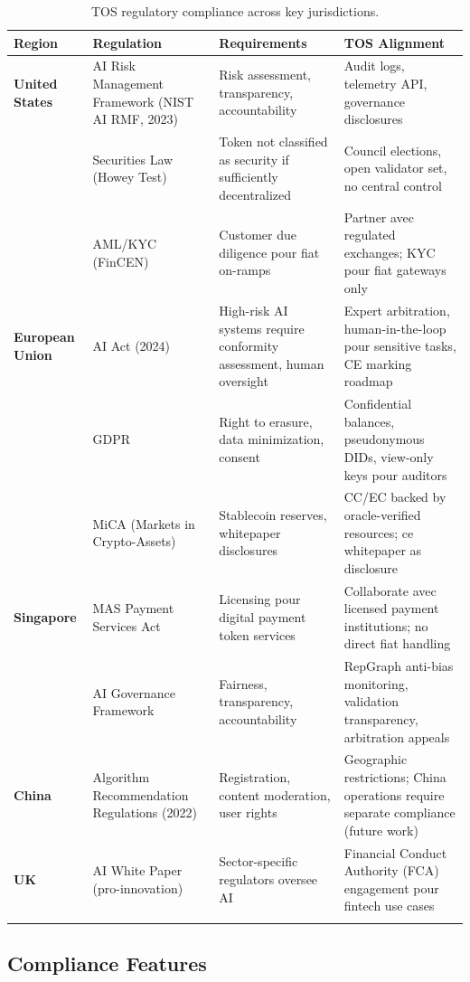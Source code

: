 \documentclass[11pt]{article}
\begin{document}
\begin{longtable}{@{}p{}p{}p{}p{}@{}}
\toprule
\textbf{Region} & \textbf{Regulation} & \textbf{Requirements} & \textbf{TOS Alignment} \\\midrule
\textbf{United States} & AI Risk Management Framework (NIST AI RMF, 2023) & Risk assessment, transparency, accountability & Audit logs, telemetry API, governance disclosures \\
 & Securities Law (Howey Test) & Token not classified as security if sufficiently decentralized & Council elections, open validator set, no central control \\
 & AML/KYC (FinCEN) & Customer due diligence pour fiat on-ramps & Partner avec regulated exchanges; KYC pour fiat gateways only \\
\textbf{European Union} & AI Act (2024) & High-risk AI systems require conformity assessment, human oversight & Expert arbitration, human-in-the-loop pour sensitive tasks, CE marking roadmap \\
 & GDPR & Right to erasure, data minimization, consent & Confidential balances, pseudonymous DIDs, view-only keys pour auditors \\
 & MiCA (Markets in Crypto-Assets) & Stablecoin reserves, whitepaper disclosures & CC/EC backed by oracle-verified resources; ce whitepaper as disclosure \\
\textbf{Singapore} & MAS Payment Services Act & Licensing pour digital payment token services & Collaborate avec licensed payment institutions; no direct fiat handling \\
 & AI Governance Framework & Fairness, transparency, accountability & RepGraph anti-bias monitoring, validation transparency, arbitration appeals \\
\textbf{China} & Algorithm Recommendation Regulations (2022) & Registration, content moderation, user rights & Geographic restrictions; China operations require separate compliance (future work) \\
\textbf{UK} & AI White Paper (pro-innovation) & Sector-specific regulators oversee AI & Financial Conduct Authority (FCA) engagement pour fintech use cases \\
\bottomrule
\caption{TOS regulatory compliance across key jurisdictions.}
\end{longtable}

\subsection{Compliance Features}
\end{document}
